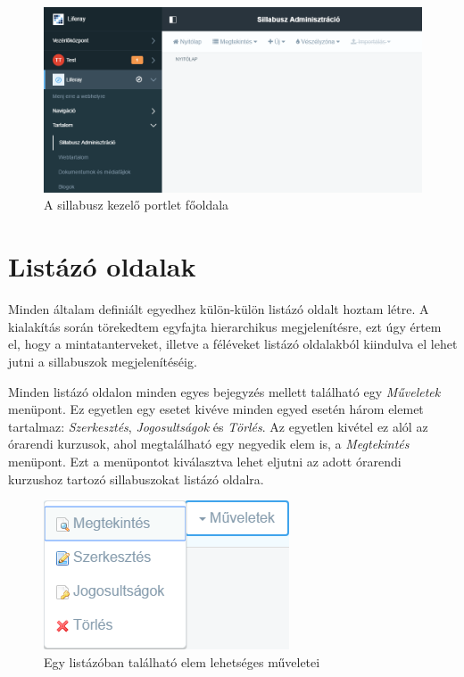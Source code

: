 \documentclass[hidelinks, 12pt, a4paper]{report}
\begin{document}
\begin{figure}[H]
    \centering
	\includegraphics[width=\textwidth]{sm_main_page.png}
	\caption{A sillabusz kezelő portlet főoldala}
\end{figure}

\section{Listázó oldalak}

Minden általam definiált egyedhez külön-külön listázó oldalt hoztam létre. A kialakítás során törekedtem egyfajta hierarchikus megjelenítésre, ezt úgy értem el, hogy a mintatanterveket, illetve a féléveket listázó oldalakból kiindulva el lehet jutni a sillabuszok megjelenítéséig.

Minden listázó oldalon minden egyes bejegyzés mellett található egy \emph{Műveletek} menüpont. Ez egyetlen egy esetet kivéve minden egyed esetén három elemet tartalmaz: \emph{Szerkesztés}, \emph{Jogosultságok} és \emph{Törlés}. Az egyetlen kivétel ez alól az órarendi kurzusok, ahol megtalálható egy negyedik elem is, a \emph{Megtekintés} menüpont. Ezt a menüpontot kiválasztva lehet eljutni az adott órarendi kurzushoz tartozó sillabuszokat listázó oldalra.

\begin{figure}[H]
    \centering
	\includegraphics{sm_list_actions_timetable_course.png}
	\caption{Egy listázóban található elem lehetséges műveletei}
\end{figure}
\end{document}
